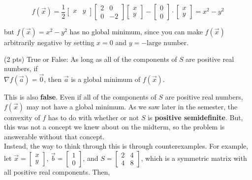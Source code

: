 \documentclass[11pt]{article}
\begin{document}
\begin{prob}
\begin{subprob}
\begin{solution}
$$f(\vec x) = \frac{1}{2} \begin{bmatrix} x & y \end{bmatrix} \begin{bmatrix} 2 & 0 \\ 0 & -2 \end{bmatrix} \begin{bmatrix} x \\ y \end{bmatrix} - \begin{bmatrix} 0 \\ 0 \end{bmatrix} \cdot \begin{bmatrix} x \\ y \end{bmatrix} = x^2 - y^2$$

but $f(\vec x) = x^2 - y^2$ has no global minimum, since you can make $f(\vec x)$ arbitrarily negative by setting $x = 0$ and $y = -\text{large number}$.
\end{solution}
\end{subprob}

\begin{subprob}(2 pts) True or False: As long as all of the components of $S$ are positive real numbers, if 
\\ $\nabla f(\vec a) = \vec 0$, then $\vec a$ is a global minimum of $f(\vec x)$.

 

\begin{solution}
This is also \textbf{false}. Even if all of the components of $S$ are positive real numbers, $f(\vec x)$ may not have a global minimum. As we saw later in the semester, the convexity of $f$ has to do with whether or not $S$ is \textbf{positive semidefinite}. But, this was not a concept we knew about on the midterm, so the problem is answerable without that concept. \\

Instead, the way to think through this is through counterexamples. For example, let $\vec x = \begin{bmatrix} x \\ y \end{bmatrix}$, $\vec b = \begin{bmatrix} 1 \\ 0 \end{bmatrix}$, and $S = \begin{bmatrix} 2 & 4 \\ 4 & 8 \end{bmatrix}$, which is a symmetric matrix with all positive real components. Then,


\end{solution}
\end{subprob}
\end{prob}
\end{document}
